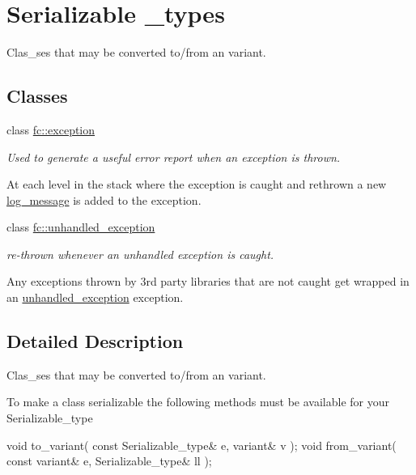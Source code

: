 \hypertarget{group__serializable}{}\section{Serializable \+\_\+types}
\label{group__serializable}


Clas\+\_\+ses that may be converted to/from an variant.  


\subsection*{Classes}
\begin{DoxyCompactItemize}
\item 
class \mbox{\hyperlink{classfc_1_1exception}{fc\+::exception}}
\begin{DoxyCompactList}\small\item\em Used to generate a useful error report when an exception is thrown.

At each level in the stack where the exception is caught and rethrown a new \mbox{\hyperlink{classfc_1_1log__message}{log\+\_\+message}} is added to the exception. \end{DoxyCompactList}\item 
class \mbox{\hyperlink{classfc_1_1unhandled__exception}{fc\+::unhandled\+\_\+exception}}
\begin{DoxyCompactList}\small\item\em re-\/thrown whenever an unhandled exception is caught.

Any exceptions thrown by 3rd party libraries that are not caught get wrapped in an \mbox{\hyperlink{classfc_1_1unhandled__exception}{unhandled\+\_\+exception}} exception. \end{DoxyCompactList}\end{DoxyCompactItemize}


\subsection{Detailed Description}
Clas\+\_\+ses that may be converted to/from an variant. 

To make a class \textquotesingle{}serializable\textquotesingle{} the following methods must be available for your Serializable\+\_\+type


\begin{DoxyCode}
\textcolor{keywordtype}{void}   to\_variant( \textcolor{keyword}{const} Serializable\_type& e, variant& v );
\textcolor{keywordtype}{void}   from\_variant( \textcolor{keyword}{const} variant& e, Serializable\_type& ll );
\end{DoxyCode}
 
